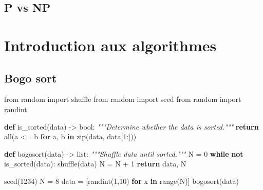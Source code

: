\documentclass[
  letterpaper,
]{scrbook}
\newenvironment{Shaded}{}{}
\newcommand{\BuiltInTok}[1]{#1}
\newcommand{\CommentTok}[1]{\textcolor[rgb]{0.38,0.63,0.69}{\textit{#1}}}
\newcommand{\ControlFlowTok}[1]{\textcolor[rgb]{0.00,0.44,0.13}{\textbf{#1}}}
\newcommand{\DecValTok}[1]{\textcolor[rgb]{0.25,0.63,0.44}{#1}}
\newcommand{\ImportTok}[1]{#1}
\newcommand{\KeywordTok}[1]{\textcolor[rgb]{0.00,0.44,0.13}{\textbf{#1}}}
\newcommand{\NormalTok}[1]{#1}
\newcommand{\OperatorTok}[1]{\textcolor[rgb]{0.40,0.40,0.40}{#1}}
\theoremstyle{plain}
\theoremstyle{definition}
\theoremstyle{definition}
\theoremstyle{remark}
\begin{document}
\hypertarget{p-vs-np}{%
\section{P vs NP}\label{p-vs-np}}


\hypertarget{introduction-aux-algorithmes}{%
\chapter{Introduction aux
algorithmes}\label{introduction-aux-algorithmes}}

\hypertarget{bogo-sort}{%
\section{Bogo sort}\label{bogo-sort}}

\begin{Shaded}
\begin{Highlighting}[]
\ImportTok{from}\NormalTok{ random }\ImportTok{import}\NormalTok{ shuffle}
\ImportTok{from}\NormalTok{ random }\ImportTok{import}\NormalTok{ seed}
\ImportTok{from}\NormalTok{ random }\ImportTok{import}\NormalTok{ randint}

\KeywordTok{def}\NormalTok{ is\_sorted(data) }\OperatorTok{{-}\textgreater{}} \BuiltInTok{bool}\NormalTok{:}
    \CommentTok{"""Determine whether the data is sorted."""}
    \ControlFlowTok{return} \BuiltInTok{all}\NormalTok{(a }\OperatorTok{\textless{}=}\NormalTok{ b }\ControlFlowTok{for}\NormalTok{ a, b }\KeywordTok{in} \BuiltInTok{zip}\NormalTok{(data, data[}\DecValTok{1}\NormalTok{:]))}

\KeywordTok{def}\NormalTok{ bogosort(data) }\OperatorTok{{-}\textgreater{}} \BuiltInTok{list}\NormalTok{:}
    \CommentTok{"""Shuffle data until sorted."""}
\NormalTok{    N }\OperatorTok{=} \DecValTok{0}
    \ControlFlowTok{while} \KeywordTok{not}\NormalTok{ is\_sorted(data):}
\NormalTok{        shuffle(data)}
\NormalTok{        N }\OperatorTok{=}\NormalTok{ N }\OperatorTok{+} \DecValTok{1}
    \ControlFlowTok{return}\NormalTok{ data, N}

\NormalTok{seed(}\DecValTok{1234}\NormalTok{)}
\NormalTok{N }\OperatorTok{=} \DecValTok{8}
\NormalTok{data }\OperatorTok{=}\NormalTok{ [randint(}\DecValTok{1}\NormalTok{,}\DecValTok{10}\NormalTok{) }\ControlFlowTok{for}\NormalTok{ x }\KeywordTok{in} \BuiltInTok{range}\NormalTok{(N)]}
\NormalTok{bogosort(data)}
\end{Highlighting}
\end{Shaded}
\end{document}
